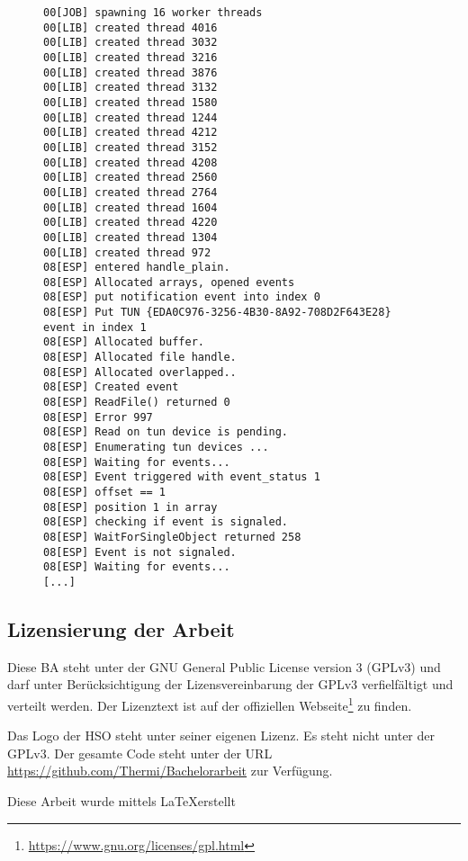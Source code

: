 \begin{figure}
\begin{lstlisting}[caption=Debug-Log; Zeigt Problematik mit WaitForSingleObject()]
00[JOB] spawning 16 worker threads
00[LIB] created thread 4016
00[LIB] created thread 3032
00[LIB] created thread 3216
00[LIB] created thread 3876
00[LIB] created thread 3132
00[LIB] created thread 1580
00[LIB] created thread 1244
00[LIB] created thread 4212
00[LIB] created thread 3152
00[LIB] created thread 4208
00[LIB] created thread 2560
00[LIB] created thread 2764
00[LIB] created thread 1604
00[LIB] created thread 4220
00[LIB] created thread 1304
00[LIB] created thread 972
08[ESP] entered handle_plain.
08[ESP] Allocated arrays, opened events
08[ESP] put notification event into index 0
08[ESP] Put TUN {EDA0C976-3256-4B30-8A92-708D2F643E28} event in index 1
08[ESP] Allocated buffer.
08[ESP] Allocated file handle.
08[ESP] Allocated overlapped..
08[ESP] Created event
08[ESP] ReadFile() returned 0
08[ESP] Error 997
08[ESP] Read on tun device is pending.
08[ESP] Enumerating tun devices ...
08[ESP] Waiting for events...
08[ESP] Event triggered with event_status 1
08[ESP] offset == 1
08[ESP] position 1 in array
08[ESP] checking if event is signaled.
08[ESP] WaitForSingleObject returned 258
08[ESP] Event is not signaled.
08[ESP] Waiting for events...
[...]
\end{lstlisting}
\end{figure}
\subsection{Lizensierung der Arbeit}
Diese \ac{BA} steht unter der GNU General Public License version 3 (GPLv3)
und darf unter Berücksichtigung der Lizensvereinbarung der GPLv3 verfielfältigt
und verteilt werden. Der Lizenztext ist auf der offiziellen Webseite\footnote{\url{https://www.gnu.org/licenses/gpl.html}}
zu finden.

Das Logo der \ac{HSO} steht unter seiner eigenen Lizenz. Es steht nicht unter der GPLv3.
Der gesamte Code steht unter der URL \url{https://github.com/Thermi/Bachelorarbeit} zur Verfügung.

\begin{centering} 

Diese Arbeit wurde mittels \LaTeX erstellt
\end{centering}
